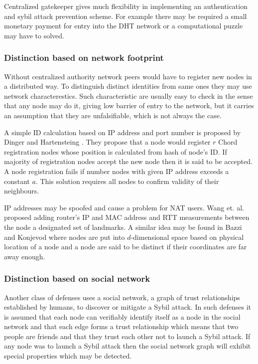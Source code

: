   Centralized gatekeeper gives much flexibility in implementing an
  authentication and sybil attack prevention scheme. For example there may be
  required a small monetary payment for entry into the DHT network or a
  computational puzzle may have to solved.

  \subsubsection{Distinction based on network footprint}

  Without centralized authority network peers would have to register new nodes
  in a distributed way. To distinguish distinct identities from same ones they
  may use network characterestics. Such characteristic are usually easy to check
  in the sense that any node may do it, giving low barrier of entry to the
  network, but it carries an assumption that they are unfalsifiable, which is
  not always the case.

  A simple ID calculation based on IP address and port number is proposed by
  Dinger and Hartensteing \cite[p. 6]{dou02}. They propose that a node would
  register $r$ Chord registration nodes whose position is calculated from hash
  of node's ID. If majority of registration nodes accept the new node then it is
  said to be accepted. A node registration fails if number nodes with given IP
  address exceeds a constant $a$. This solution requires all nodes to confirm
  validity of their neighbours.

  IP addresses may be spoofed and cause a problem for NAT users. Wang et. al.
  \cite[p. 7]{dou02} proposed adding router's IP and MAC address and RTT
  measurements between the node a designated set of landmarks. A similar idea
  may be found in Bazzi and Konjevod \cite[p. 7]{dou02} where nodes are put into
  $d$-dimensional space based on physical location of a node and a node are said
  to be distinct if their coordinates are far away enough.

  \subsubsection{Distinction based on social network}

  Another class of defenses uses a social network, a graph of trust
  relationships established by humans, to discover or mitigate a Sybil attack.
  In such defenses it is assumed that each node can verifiably identify itself
  as a node in the social network and that each edge forms a trust relationship
  which means that two people are friends and that they trust each other not to
  launch a Sybil attack. If any node was to launch a Sybil attack then the
  social network graph will exhibit special properties which may be detected. 

